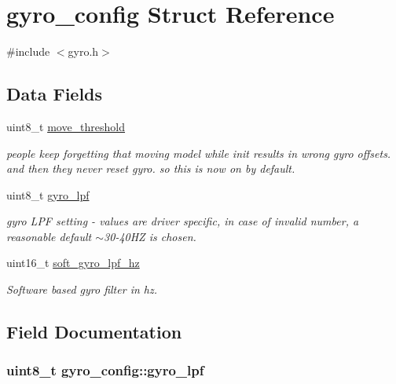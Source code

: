 \hypertarget{structgyro__config}{\section{gyro\+\_\+config Struct Reference}
\label{structgyro__config}
}


{\ttfamily \#include $<$gyro.\+h$>$}

\subsection*{Data Fields}
\begin{DoxyCompactItemize}
\item 
uint8\+\_\+t \hyperlink{structgyro__config_aa4ff0a56b9956a8f1581ffb4d7b7d123}{move\+\_\+threshold}
\begin{DoxyCompactList}\small\item\em people keep forgetting that moving model while init results in wrong gyro offsets. and then they never reset gyro. so this is now on by default. \end{DoxyCompactList}\item 
uint8\+\_\+t \hyperlink{structgyro__config_a26241fd02d8e444f99a006fa52098630}{gyro\+\_\+lpf}
\begin{DoxyCompactList}\small\item\em gyro L\+P\+F setting -\/ values are driver specific, in case of invalid number, a reasonable default $\sim$30-\/40\+H\+Z is chosen. \end{DoxyCompactList}\item 
uint16\+\_\+t \hyperlink{structgyro__config_af96fd78759f2fca1a0a20b7a71c8da11}{soft\+\_\+gyro\+\_\+lpf\+\_\+hz}
\begin{DoxyCompactList}\small\item\em Software based gyro filter in hz. \end{DoxyCompactList}\end{DoxyCompactItemize}


\subsection{Field Documentation}
\hypertarget{structgyro__config_a26241fd02d8e444f99a006fa52098630}{
\subsubsection[{gyro\+\_\+lpf}]{\setlength{\rightskip}{0pt plus 5cm}uint8\+\_\+t gyro\+\_\+config\+::gyro\+\_\+lpf}}\label{structgyro__config_a26241fd02d8e444f99a006fa52098630}


